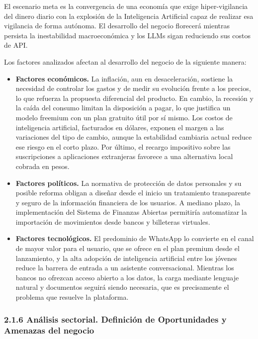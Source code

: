 El escenario meta es la convergencia de una economía que exige
hiper-vigilancia del dinero diario con la explosión de la Inteligencia
Artificial capaz de realizar esa vigilancia de forma autónoma. El
desarrollo del negocio florecerá mientras persista la inestabilidad
macroeconómica y los LLMs sigan reduciendo sus costos de API.

Los factores analizados afectan al desarrollo del negocio de la
siguiente manera:

\begin{itemize}
\tightlist
\item
  \textbf{Factores económicos.} La inflación, aun en desaceleración,
  sostiene la necesidad de controlar los gastos y de medir su evolución
  frente a los precios, lo que refuerza la propuesta diferencial del
  producto. En cambio, la recesión y la caída del consumo limitan la
  disposición a pagar, lo que justifica un modelo freemium con un plan
  gratuito útil por sí mismo. Los costos de inteligencia artificial,
  facturados en dólares, exponen el margen a las variaciones del tipo de
  cambio, aunque la estabilidad cambiaria actual reduce ese riesgo en el
  corto plazo. Por último, el recargo impositivo sobre las suscripciones
  a aplicaciones extranjeras favorece a una alternativa local cobrada en
  pesos.
\item
  \textbf{Factores políticos.} La normativa de protección de datos
  personales y su posible reforma obligan a diseñar desde el inicio un
  tratamiento transparente y seguro de la información financiera de los
  usuarios. A mediano plazo, la implementación del Sistema de Finanzas
  Abiertas permitiría automatizar la importación de movimientos desde
  bancos y billeteras virtuales.
\item
  \textbf{Factores tecnológicos.} El predominio de WhatsApp lo convierte
  en el canal de mayor valor para el usuario, que se ofrece en el plan
  premium desde el lanzamiento, y la alta adopción de inteligencia
  artificial entre los jóvenes reduce la barrera de entrada a un
  asistente conversacional. Mientras los bancos no ofrezcan acceso
  abierto a los datos, la carga mediante lenguaje natural y documentos
  seguirá siendo necesaria, que es precisamente el problema que resuelve
  la plataforma.
\end{itemize}

\subsubsection*{2.1.6 Análisis sectorial. Definición de Oportunidades y
Amenazas del
negocio}\label{anuxe1lisis-sectorial.-definiciuxf3n-de-oportunidades-y-amenazas-del-negocio}

